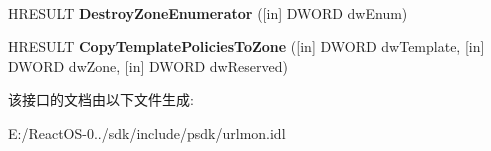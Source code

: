 \begin{DoxyCompactItemize}
$$\item 
\mbox{\label{interface_i_internet_zone_manager_a31c1e0bf194aa8412922787e0bd0f91a}} 
H\+R\+E\+S\+U\+LT {\bfseries Destroy\+Zone\+Enumerator} (\mbox{[}in\mbox{]} D\+W\+O\+RD dw\+Enum)
\item 
\mbox{\label{interface_i_internet_zone_manager_a114b4e1dc969f49b82c236de74e153db}} 
H\+R\+E\+S\+U\+LT {\bfseries Copy\+Template\+Policies\+To\+Zone} (\mbox{[}in\mbox{]} D\+W\+O\+RD dw\+Template, \mbox{[}in\mbox{]} D\+W\+O\+RD dw\+Zone, \mbox{[}in\mbox{]} D\+W\+O\+RD dw\+Reserved)
\end{DoxyCompactItemize}


该接口的文档由以下文件生成\+:\begin{DoxyCompactItemize}
\item 
E\+:/\+React\+O\+S-\/0../sdk/include/psdk/urlmon.\+idl\end{DoxyCompactItemize}
